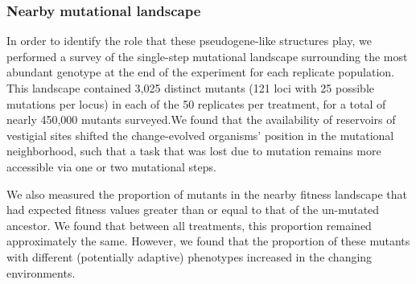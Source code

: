 \documentclass[10pt,letterpaper]{article}
\begin{document}
\subsubsection*{Nearby mutational landscape}

In order to identify the role that these pseudogene-like structures play, we performed a survey of the single-step mutational landscape surrounding the most abundant genotype at the end of the experiment for each replicate population. This landscape contained 3,025 distinct mutants (121 loci with 25 possible mutations per locus) in each of the 50 replicates per treatment, for a total of nearly 450,000 mutants surveyed.We found that the availability of reservoirs of vestigial sites shifted the change-evolved organisms' position in the mutational neighborhood, such that a task that was lost due to mutation remains more accessible via one or two mutational steps.

We also measured the proportion of mutants in the nearby fitness landscape that had expected fitness values greater than or equal to that of the un-mutated ancestor. We found that between all treatments, this proportion
remained approximately the same. However, we found that the proportion of these mutants with different (potentially adaptive) phenotypes increased in the changing environments.
\end{document}
